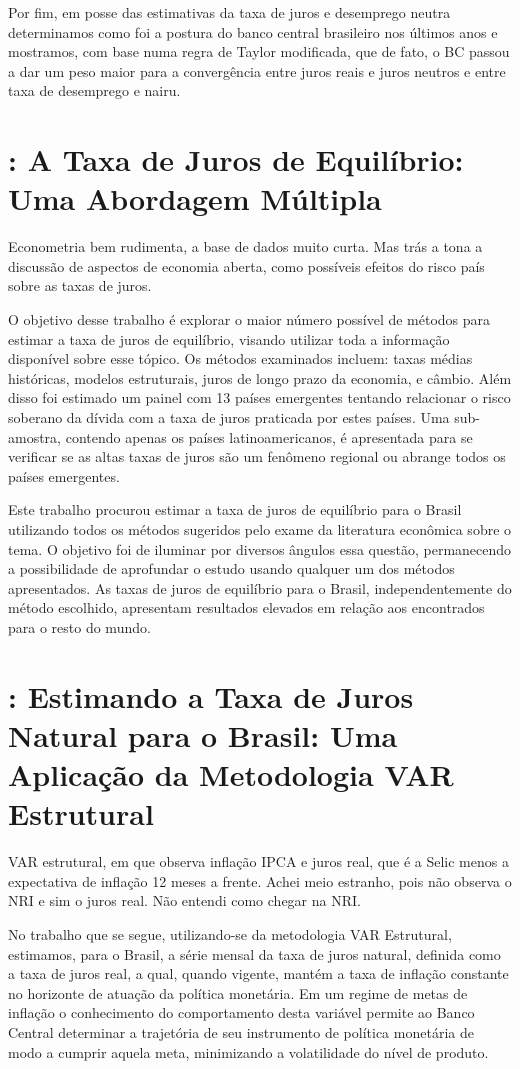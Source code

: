 Por fim, em posse das estimativas da taxa de juros e desemprego neutra determinamos como foi a postura do banco central brasileiro nos últimos anos e mostramos, com base numa regra de Taylor modificada, que de fato, o BC passou a dar um peso maior para a convergência entre juros reais e juros neutros e entre taxa de desemprego e nairu.
%
%
\section{\citet{Kfoury:2003}: A Taxa de Juros de Equilíbrio: Uma Abordagem Múltipla }
Econometria bem rudimenta, a base de dados muito curta. Mas trás a tona a discussão de aspectos de economia aberta, como possíveis efeitos do risco país sobre as taxas de juros.

O objetivo desse trabalho é explorar o maior número possível de métodos para estimar a taxa de juros de equilíbrio, visando utilizar toda a informação disponível sobre esse tópico. Os métodos examinados incluem: taxas médias históricas, modelos estruturais, juros de longo prazo da economia, e câmbio. Além disso foi estimado um painel com 13 países emergentes tentando relacionar o risco soberano da dívida com a taxa de juros praticada por estes países. Uma sub-amostra, contendo apenas os países latinoamericanos, é apresentada para se verificar se as altas taxas de juros são um fenômeno regional ou abrange todos os países emergentes.

Este trabalho procurou estimar a taxa de juros de equilíbrio para o Brasil utilizando todos os métodos sugeridos pelo exame da literatura econômica sobre o tema. O objetivo foi de iluminar por diversos ângulos essa questão, permanecendo a possibilidade de aprofundar o estudo usando qualquer um dos métodos apresentados. As taxas de juros de equilíbrio para o Brasil, independentemente do método escolhido, apresentam resultados elevados em relação aos encontrados para o resto do mundo.
%
%
\section{\citet{Borges:2006}: Estimando a Taxa de Juros Natural para o Brasil: Uma Aplicação da Metodologia VAR Estrutural}

VAR estrutural, em que observa inflação IPCA e juros real, que é a Selic menos a expectativa de inflação 12 meses a frente. Achei meio estranho, pois não observa o NRI e sim o juros real. Não entendi como chegar na NRI.

No trabalho que se segue, utilizando-se da metodologia VAR Estrutural, estimamos, para o Brasil, a série mensal da taxa de juros natural, definida como a taxa de juros real, a qual, quando vigente, mantém a taxa de inflação constante no horizonte de atuação da política monetária. Em um regime de metas de inflação o conhecimento do comportamento desta variável permite ao Banco Central determinar a trajetória de seu instrumento de política monetária de modo a cumprir aquela meta, minimizando a volatilidade do nível de produto.

